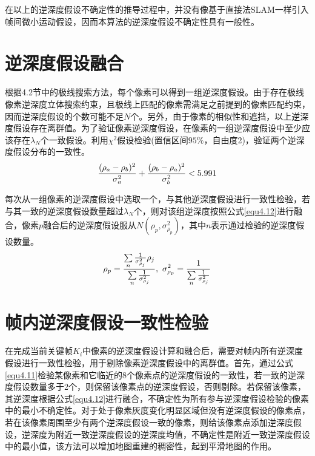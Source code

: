 在以上的逆深度假设不确定性的推导过程中，并没有像基于直接法SLAM一样引入帧间微小运动假设，因而本算法的逆深度假设不确定性具有一般性。


\section{逆深度假设融合}
根据4.2节中的极线搜索方法，每个像素可以得到一组逆深度假设。由于存在极线像素逆深度立体搜索约束，且极线上匹配的像素需满足之前提到的像素匹配约束，因而逆深度假设的个数可能不足$N$个。另外，由于像素的相似性和遮挡，以上逆深度假设存在离群值。为了验证像素逆深度假设，在像素的一组逆深度假设中至少应该存在$\lambda_N$个一致假设。利用$\chi^2$假设检验(置信区间$95\%$，自由度2)，验证两个逆深度假设分布的一致性。
\begin{equation}
\label{equ4.11}
{ (\rho_a - \rho_b)^2 \over \sigma_a^2 }+{ (\rho_b - \rho_a)^2 \over \sigma_b^2} < 5.991
\end{equation}

每次从一组像素的逆深度假设中选取一个，与其他逆深度假设进行一致性检验，若与其一致的逆深度假设数量超过$\lambda_N$个，则对该组逆深度按照公式\eqref{equ4.12}进行融合\upcite{[4.3]}，像素$p$融合后的逆深度假设服从$N(\rho_p,\sigma_{\rho_p}^2)$，其中$n$表示通过检验的逆深度假设数量。
\begin{equation}
\label{equ4.12}
\rho_p = { {\sum\limits_n {1 \over \sigma_{\rho_j}^2} \rho_j } \over \sum\limits_n {1 \over \sigma_{\rho_j}^2}  }, \ 
\sigma_{\rho_p}^2 = {1 \over  \sum\limits_n { 1 \over \sigma_{\rho_j}^2}  }
\end{equation}


\section{帧内逆深度假设一致性检验}
在完成当前关键帧$K_i$中像素的逆深度假设计算和融合后，需要对帧内所有逆深度假设进行一致性检验，用于剔除像素逆深度假设中的离群值。首先，通过公式\eqref{equ4.11}检验某像素和它临近的8个像素点的逆深度假设的一致性，若一致的逆深度假设数量多于2个，则保留该像素点的逆深度假设，否则剔除。若保留该像素，其逆深度根据公式\eqref{equ4.12}进行融合，不确定性为所有参与逆深度假设检验的像素中的最小不确定性。对于处于像素灰度变化明显区域但没有逆深度假设的像素点，若在该像素周围至少有两个逆深度假设一致的像素，则给该像素点添加逆深度假设，逆深度为附近一致逆深度假设的逆深度均值，不确定性是附近一致逆深度假设中的最小值，该方法可以增加地图重建的稠密性，起到平滑地图的作用。

